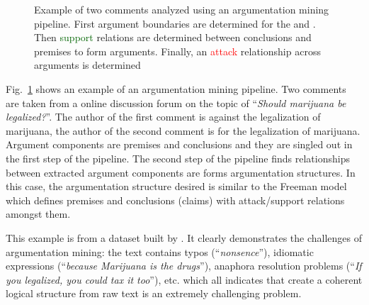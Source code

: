 \begin{figure}
\caption{Example of two comments analyzed using an argumentation mining pipeline. 
	First argument boundaries are determined for the  and 
	. Then \textcolor{darkgreen}{support} relations are
	determined between conclusions and premises
	to form arguments. Finally, an \textcolor{red}{attack} relationship
	across arguments is determined
	}
	\label{fig:example_pipeline}
\end{figure}

Fig.~\ref{fig:example_pipeline} shows an example of an argumentation mining
pipeline. Two comments are taken from a online discussion forum on the topic of
``\emph{Should marijuana be legalized?}''. The author of the first comment is
against the legalization of marijuana, the author of the second comment is for
the legalization of marijuana. 
Argument components are premises and conclusions and they are singled out in the first
step of the pipeline. The second step of the pipeline finds relationships 
between extracted argument components are forms argumentation structures. In this case,
the argumentation structure desired is similar to the Freeman model which defines 
premises and conclusions (claims) with attack/support relations amongst them. 

This example is from a dataset built by \citet{hasan2014you}. It clearly
demonstrates the challenges of argumentation mining: the text contains typos
(``\emph{nonsence}''), idiomatic expressions (``\emph{because Marijuana is the
drugs}''), anaphora resolution problems (``\emph{If you legalized, you could
tax it too}''), etc.  which all indicates that create a coherent logical
structure from raw text is an extremely challenging problem. 





